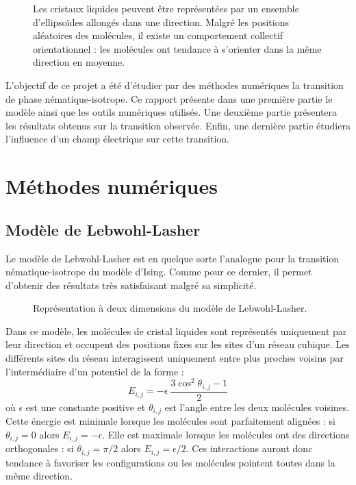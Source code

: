 \documentclass[11pt,a4paper]{article}
\numberwithin{equation}{section}
\begin{document}
\begin{figure}[h]
    \center
    
    \caption{Les cristaux liquides peuvent être représentées par un ensemble d'ellipsoïdes allongés dans une direction.
    Malgré les positions aléatoires des molécules, il existe un comportement collectif orientationnel : les molécules ont tendance à s'orienter dans la même direction en moyenne. }
    \label{nematic_phase}
\end{figure}

L'objectif de ce projet a été d'étudier par des méthodes numériques la transition de phase nématique-isotrope.
Ce rapport présente dans une première partie le modèle ainsi que les outils numériques utilisés. 
Une deuxième partie présentera les résultats obtenus sur la transition observée.
Enfin, une dernière partie étudiera l'influence d'un champ électrique sur cette transition.

\newpage
\section{Méthodes numériques}

\subsection{Modèle de Lebwohl-Lasher}
Le modèle de Lebwohl-Lasher \cite{model} est en quelque sorte l'analogue pour la transition nématique-isotrope du modèle d'Ising. Comme pour ce dernier, il permet d'obtenir des résultats très satisfaisant malgré sa simplicité.\medskip

\begin{figure}[h]
    \center
    
    \caption{Représentation à deux dimensions du modèle de Lebwohl-Lasher.}
    \label{lebwohl}
\end{figure}


Dans ce modèle, les molécules de cristal liquides sont représentés uniquement par leur direction et occupent des positions fixes sur les sites d'un réseau cubique.
Les différents sites du réseau interagissent uniquement entre plus proches voisins par l'intermédiaire d'un potentiel de la forme :
\begin{equation}
E_{i,j} = - \epsilon\ \frac{3\cos^2\theta_{i,j}-1}{2}
\end{equation}
où $\epsilon$ est une constante positive et $\theta_{i,j}$ est l'angle entre les deux molécules voisines. 
Cette énergie est minimale lorsque les molécules sont parfaitement alignées : si $\theta_{i,j} = 0$ alors $E_{i,j} = - \epsilon$. Elle est maximale lorsque les molécules ont des directions orthogonales : si $\theta_{i,j} = \pi/2$ alors $E_{i,j} = \epsilon/2$.
Ces interactions auront donc tendance à favoriser les configurations ou les molécules pointent toutes dans la même direction.\medskip
\end{document}
